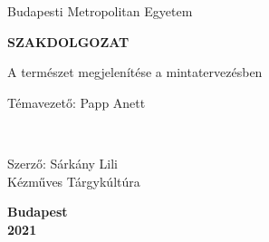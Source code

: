 \begin{titlepage}
    \begin{center}

        \Large
        Budapesti Metropolitan Egyetem
        \vfill

        \Huge
        \textbf{SZAKDOLGOZAT}
 
        \large
        \vspace{10 mm}
        A természet megjelenítése a mintatervezésben
             
 
        \vfill
             

        \begin{minipage}{0.4\textwidth}
            \begin{flushleft}
                \large
                Témavezető: Papp Anett \\ 
            \end{flushleft}
        \end{minipage}
        ~
        \begin{minipage}{0.4\textwidth}
            \begin{flushright}
                \large
                Szerző: Sárkány Lili \\ Kézműves Tárgykúltúra
            \end{flushright}
        \end{minipage}

        \vspace{3 cm}
      
             
        \textbf{Budapest}\\
        \textbf{2021}
        \vspace{5 mm}
             
    \end{center}
 \end{titlepage}